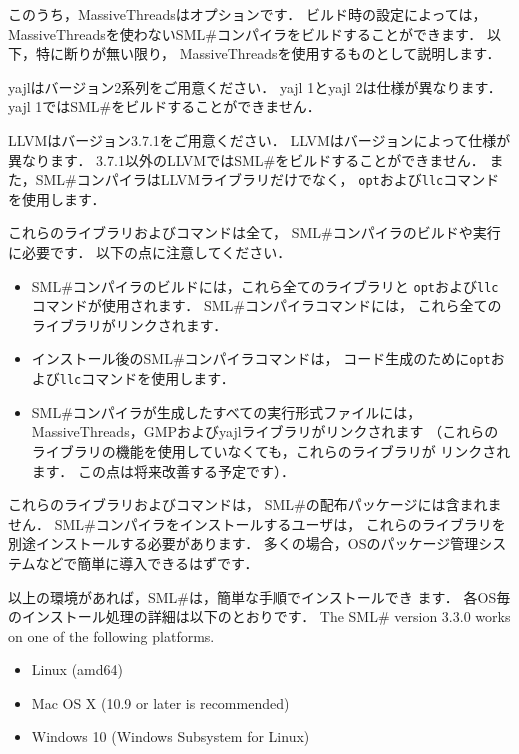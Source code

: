 \documentclass{jbook}
\newcommand{\smlsharp}{SML\#}
\newcommand{\version}{3.3.0}
\begin{document}
	このうち，MassiveThreadsはオプションです．
	ビルド時の設定によっては，
MassiveThreadsを使わない\smlsharp{}コンパイラをビルドすることができます．
	以下，特に断りが無い限り，
MassiveThreadsを使用するものとして説明します．

	yajlはバージョン2系列をご用意ください．
	yajl 1とyajl 2は仕様が異なります．
        yajl 1では\smlsharp{}をビルドすることができません．

	LLVMはバージョン3.7.1をご用意ください．
	LLVMはバージョンによって仕様が異なります．
	3.7.1以外のLLVMでは\smlsharp{}をビルドすることができません．
	また，\smlsharp{}コンパイラはLLVMライブラリだけでなく，
{\tt opt}および{\tt llc}コマンドを使用します．

	これらのライブラリおよびコマンドは全て，
\smlsharp{}コンパイラのビルドや実行に必要です．
	以下の点に注意してください．
\begin{itemize}
\item
	\smlsharp{}コンパイラのビルドには，これら全てのライブラリと
{\tt opt}および{\tt llc}コマンドが使用されます．
	\smlsharp{}コンパイラコマンドには，
これら全てのライブラリがリンクされます．
\item
	インストール後の\smlsharp{}コンパイラコマンドは，
コード生成のために{\tt opt}および{\tt llc}コマンドを使用します．
\item
	\smlsharp{}コンパイラが生成したすべての実行形式ファイルには，
MassiveThreads，GMPおよびyajlライブラリがリンクされます
（これらのライブラリの機能を使用していなくても，これらのライブラリが
リンクされます．
	この点は将来改善する予定です）．
\end{itemize}

	これらのライブラリおよびコマンドは，
\smlsharp{}の配布パッケージには含まれません．
	\smlsharp{}コンパイラをインストールするユーザは，
これらのライブラリを別途インストールする必要があります．
	多くの場合，OSのパッケージ管理システムなどで簡単に導入できるはずです．

	以上の環境があれば，\smlsharp{}は，簡単な手順でインストールでき
ます．
	各OS毎のインストール処理の詳細は以下のとおりです．
\else%
	The \smlsharp{} version \version{} works on one of the following
platforms.
\begin{itemize}
\item Linux (amd64)
\item Mac OS X (10.9 or later is recommended)
\item Windows 10 (Windows Subsystem for Linux)
\end{itemize}
\end{document}
